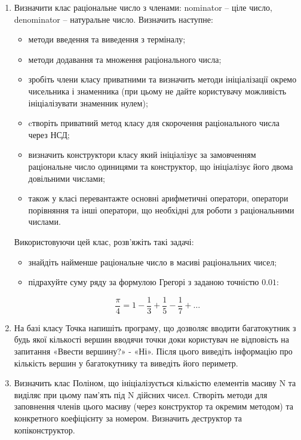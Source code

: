 \documentclass[]{article}
\begin{document}
\begin{enumerate}
\def\labelenumi{\arabic{enumi}.}
\item
  Визначити клас раціональне число
  з членами: nominator -- ціле число, denominator -- натуральне число.
  Визначить наступне:

  \begin{itemize}
  \item
    методи введення та виведення з терміналу;
  \item
    методи додавання та множення раціонального числа;
  \item
    зробіть члени класу приватними та визначить методи ініціалізації
    окремо чисельника і знаменника (при цьому не дайте користувачу
    можливість ініціалізувати знаменник нулем);
  \item
    cтворіть приватний метод класу для скорочення раціонального числа
    через НСД;
  \item
    визначить конструктори класу який ініціалізує за замовченням
    раціональне число одиницями та конструктор, що ініціалізує його
    двома довільними числами;
  \item
    також у класі перевантажте основні арифметичні оператори, оператори
    порівняння та інші оператори, що необхідні для роботи з
    раціональними числами.
  \end{itemize}

  Використовуючи цей клас, розв'яжіть такі задачі:

  \begin{itemize}
  \item
    знайдіть найменше раціональне число в масиві раціональних чисел;
  \item
    підрахуйте суму ряду за формулою Грегорі з заданою точністю
    \(0.01\):
  \end{itemize}

\[\frac{\pi}{4} = 1 - \frac{1}{3} + \frac{1}{5} - \frac{1}{7} + \ldots\]

\item
  На базі класу Точка напишіть програму, що дозволяє вводити
  багатокутник з будь якої кількості вершин вводячи точки доки
  користувач не відповість на запитання «Ввести вершину?» - «Ні». Після
  цього виведіть інформацію про кількість вершин у багатокутнику та
  виведіть його периметр.
\item
  Визначить клас Поліном, що ініціалізується кількістю елементів масиву
  N та виділяє при цьому пам'ять під N дійсних чисел. Створіть методи
  для заповнення членів цього масиву (через конструктор та окремим
  методом) та конкретного коефіцієнту за номером. Визначить деструктор
  та копіконструктор.
\end{enumerate}
\end{document}
